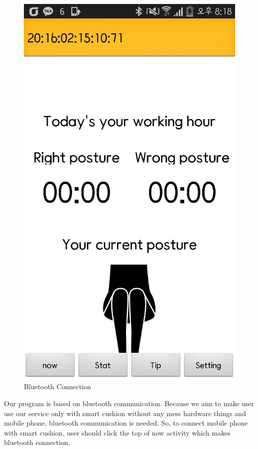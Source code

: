 \documentclass[conference]{IEEEtran}
\begin{document}
\begin{figure}[H]
\begin{center}
    \includegraphics[scale=0.4]{bluetooth}
    \caption{Bluetooth Connection} 
\end{center}
\end{figure}

Our program is based on bluetooth communication. Because we aim to make user use our service only with smart cushion without any mess hardware things and mobile phone, bluetooth communication is needed. So, to connect mobile phone with smart cushion, user should click the top of now activity which makes bluetooth connection.
\end{document}
